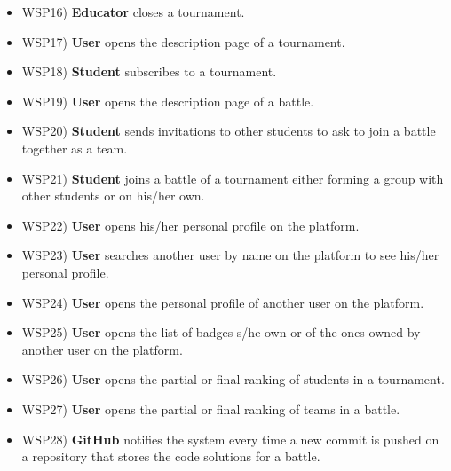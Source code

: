 \begin{itemize}
		\item WSP16) \textbf{Educator} closes a tournament.
		\item WSP17) \textbf{User} opens the description page of a tournament.
		\item WSP18) \textbf{Student} subscribes to a tournament.
		\item WSP19) \textbf{User} opens the description page of a battle.
		\item WSP20) \textbf{Student} sends invitations to other students to ask to join a battle together as a team.
		\item WSP21) \textbf{Student} joins a battle of a tournament either forming a group with other students or on his/her own.
		\item WSP22) \textbf{User} opens his/her personal profile on the platform.
		\item WSP23) \textbf{User} searches another user by name on the platform to see his/her personal profile.
		\item WSP24) \textbf{User} opens the personal profile of another user on the platform.
		\item WSP25) \textbf{User} opens the list of badges s/he own or of the ones owned by another user on the platform.
		\item WSP26) \textbf{User} opens the partial or final ranking of students in a tournament.
		\item WSP27) \textbf{User} opens the partial or final ranking of teams in a battle.
		\item WSP28) \textbf{GitHub} notifies the system every time a new commit is pushed on a repository that stores the code solutions for a battle.
	\end{itemize}
	
